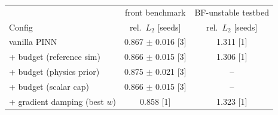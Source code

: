 \begin{tabular}{lcc}
\toprule
 & front benchmark & BF-unstable testbed \\
Config & rel.\ $L_2$ [seeds] & rel.\ $L_2$ [seeds] \\
\midrule
vanilla PINN & 0.867 $\pm$ 0.016 [3] & 1.311 [1] \\
+ budget (reference sim) & 0.866 $\pm$ 0.015 [3] & 1.306 [1] \\
+ budget (physics prior) & 0.875 $\pm$ 0.021 [3] & -- \\
+ budget (scalar cap) & 0.866 $\pm$ 0.015 [3] & -- \\
+ gradient damping (best $w$) & 0.858 [1] & 1.323 [1] \\
\bottomrule
\end{tabular}